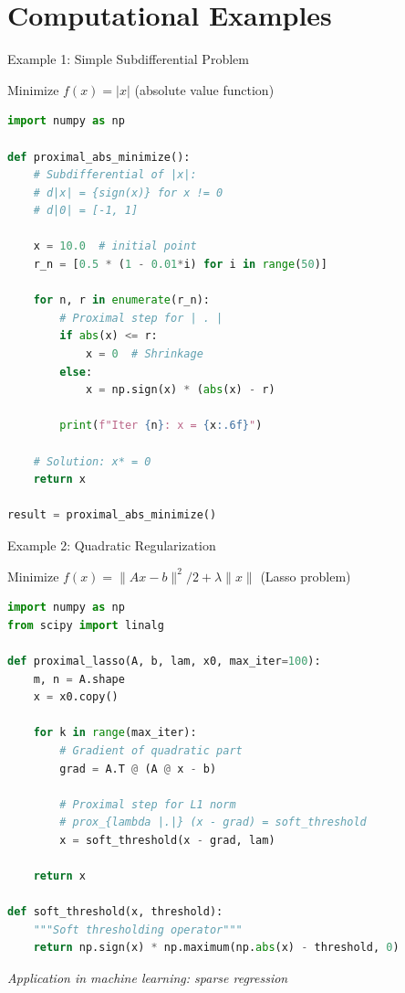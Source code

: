 \documentclass[aspectratio=169,10pt]{beamer}
\begin{document}
\section{Computational Examples}

\begin{frame}[fragile]{Example 1: Simple Subdifferential Problem}
    \begin{problem}
        Minimize $f(x) = |x|$ (absolute value function)
    \end{problem}

    \begin{lstlisting}[language=Python]
import numpy as np

def proximal_abs_minimize():
    # Subdifferential of |x|:
    # d|x| = {sign(x)} for x != 0
    # d|0| = [-1, 1]

    x = 10.0  # initial point
    r_n = [0.5 * (1 - 0.01*i) for i in range(50)]

    for n, r in enumerate(r_n):
        # Proximal step for | . |
        if abs(x) <= r:
            x = 0  # Shrinkage
        else:
            x = np.sign(x) * (abs(x) - r)

        print(f"Iter {n}: x = {x:.6f}")

    # Solution: x* = 0
    return x

result = proximal_abs_minimize()
    \end{lstlisting}
\end{frame}

\begin{frame}[fragile]{Example 2: Quadratic Regularization}
    \begin{problem}
        Minimize $f(x) = \|Ax - b\|^2/2 + \lambda\|x\|$ (Lasso problem)
    \end{problem}

    \begin{lstlisting}[language=Python]
import numpy as np
from scipy import linalg

def proximal_lasso(A, b, lam, x0, max_iter=100):
    m, n = A.shape
    x = x0.copy()

    for k in range(max_iter):
        # Gradient of quadratic part
        grad = A.T @ (A @ x - b)

        # Proximal step for L1 norm
        # prox_{lambda |.|} (x - grad) = soft_threshold
        x = soft_threshold(x - grad, lam)

    return x

def soft_threshold(x, threshold):
    """Soft thresholding operator"""
    return np.sign(x) * np.maximum(np.abs(x) - threshold, 0)
    \end{lstlisting}

    \vspace{0.2cm}
    \textit{Application in machine learning: sparse regression}
\end{frame}
\end{document}

